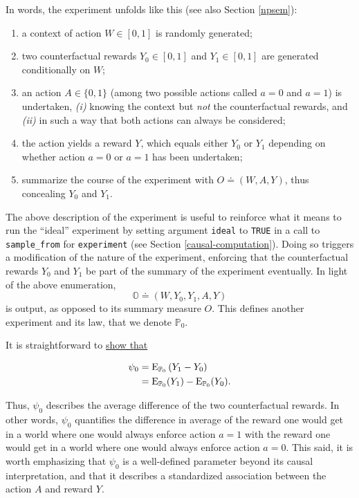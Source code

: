 \documentclass[11pt,openright,twoside]{book}
\newcommand{\bbO}{\mathbb{O}}
\newcommand{\bbP}{\mathbb{P}}
\newcommand{\defq}{\doteq}
\newcommand{\Exp}{\textrm{E}}
\theoremstyle{definition}
\theoremstyle{definition}
\theoremstyle{definition}
\theoremstyle{remark}
\begin{document}
In words, the experiment unfolds like this (see also Section \ref{npsem}):

\begin{enumerate}
\def\labelenumi{\arabic{enumi}.}
\item
  a context of action \(W \in [0,1]\) is randomly generated;
\item
  two counterfactual rewards \(Y_{0}\in [0,1]\) and \(Y_{1}\in [0,1]\) are
  generated conditionally on \(W\);
\item
  an action \(A \in \{0,1\}\) (among two possible actions called \(a=0\) and
  \(a=1\)) is undertaken, \emph{(i)} knowing the context but \emph{not} the
  counterfactual rewards, and \emph{(ii)} in such a way that both actions can
  always be considered;
\item
  the action yields a reward \(Y\), which equals either \(Y_{0}\) or \(Y_{1}\)
  depending on whether action \(a=0\) or \(a=1\) has been undertaken;
\item
  summarize the course of the experiment with \(O \defq (W, A, Y)\), thus
  concealing \(Y_{0}\) and \(Y_{1}\).
\end{enumerate}

The above description of the experiment is useful to reinforce what it means
to run the ``ideal'' experiment by setting argument \texttt{ideal} to \texttt{TRUE} in a call
to \texttt{sample\_from} for \texttt{experiment} (see Section \ref{causal-computation}).
Doing so triggers a modification of the nature of the experiment, enforcing
that the counterfactual rewards \(Y_{0}\) and \(Y_{1}\) be part of the summary of
the experiment eventually. In light of the above enumeration,
\begin{equation*}  \bbO \defq  (W,  Y_{0}, Y_{1},  A,  Y) \end{equation*} is
output, as opposed to its summary measure \(O\). This defines another
experiment and its law, that we denote \(\bbP_{0}\).

It is straightforward to \protect\hyperlink{identification}{show that}

\begin{align}
\psi_{0} &= \Exp_{\bbP_{0}} \left(Y_{1} - Y_{0}\right) \label{eq:psi-zero-bis} \\
&= \Exp_{\bbP_{0}}(Y_1) - \Exp_{\bbP_{0}}(Y_0).  \notag 
\end{align}

Thus, \(\psi_{0}\) describes the average difference of the two counterfactual
rewards. In other words, \(\psi_{0}\) quantifies the difference in average of
the reward one would get in a world where one would always enforce action
\(a=1\) with the reward one would get in a world where one would always enforce
action \(a=0\). This said, it is worth emphasizing that \(\psi_{0}\) is a
well-defined parameter beyond its causal interpretation, and that it describes
a standardized association between the action \(A\) and reward \(Y\).
\end{document}
